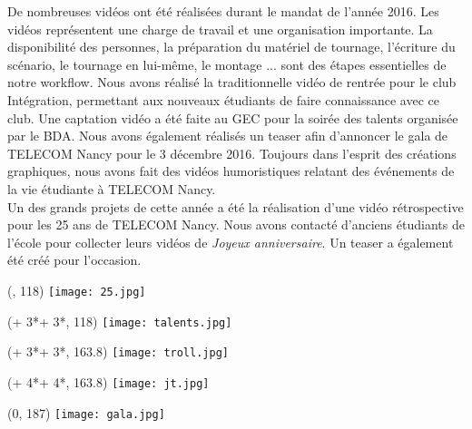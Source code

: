 De nombreuses vidéos ont été réalisées durant le mandat de l'année 2016. Les vidéos représentent une charge de travail et une organisation importante. La disponibilité des personnes, la préparation du matériel de tournage, l'écriture du scénario, le tournage en lui-même, le montage ... sont des étapes essentielles de notre workflow. Nous avons réalisé la traditionnelle vidéo de rentrée pour le club Intégration, permettant aux nouveaux étudiants de faire connaissance avec ce club. Une captation vidéo a été faite au GEC pour la soirée des talents organisée par le BDA. Nous avons également réalisés un teaser afin d'annoncer le gala de TELECOM Nancy pour le 3 décembre 2016. Toujours dans l'esprit des créations graphiques, nous avons fait des vidéos humoristiques relatant des événements de la vie étudiante à TELECOM Nancy.\\

Un des grands projets de cette année a été la réalisation d'une vidéo rétrospective pour les 25 ans de TELECOM Nancy. Nous avons contacté d'anciens étudiants de l'école pour collecter leurs vidéos de \textit{Joyeux anniversaire}. Un teaser a également été créé pour l'occasion.


\begin{textblock}{0}(\fixMargin, 118)
	\texttt{[image: 25.jpg]}
\end{textblock}

\begin{textblock}{0}(\numexpr \fixMargin + 3*\sizeMedia + 3*\margin, 118)
	\texttt{[image: talents.jpg]}
\end{textblock}

\begin{textblock}{0}({\numexpr \fixMargin + 3*\sizeMedia + 3*\margin}, 163.8)
	\texttt{[image: troll.jpg]}
\end{textblock}

\begin{textblock}{0}({\numexpr \fixMargin + 4*\sizeMedia + 4*\margin}, 163.8)
	\texttt{[image: jt.jpg]}
\end{textblock}


\begin{textblock}{0}(0, 187)
	\texttt{[image: gala.jpg]}
\end{textblock}